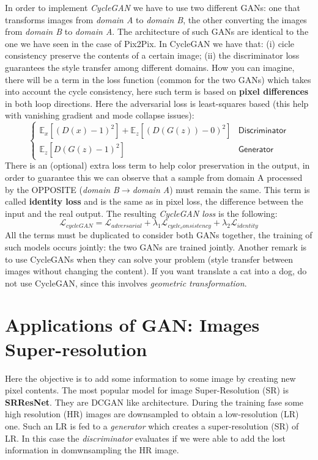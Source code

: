 In order to implement \textit{CycleGAN} we have to use two different GANs: one that transforms images from \textit{domain A} to \textit{domain B}, the other converting the images from \textit{domain B} to \textit{domain A}. The architecture of such GANs are identical to the one we have seen in the case of Pix2Pix. In CycleGAN we have that: (i) cicle consistency preserve the contents of a certain image; (ii) the discriminator loss guarantees the style transfer among different domains. How you can imagine, there will be a term in the loss function (common for the two GANs) which takes into account the cycle consistency, here such term is based on \textbf{pixel differences} in both loop directions. Here the adversarial loss is least-squares based (this help with vanishing gradient and mode collapse issues): 
\begin{equation*}
    \begin{cases}
        \mathbb{E}_x[(D(x)-1)^2]+\mathbb{E}_z[(D(G(z))-0)^2]&\textsf{Discriminator}\\
        \mathbb{E}_z[D(G(z)-1)^2]&\textsf{Generator}
    \end{cases}
\end{equation*}
\noindent
There is an (optional) extra loss term to help color preservation in the output, in order to guarantee this we can observe that a sample from domain A processed by the OPPOSITE (\textit{domain B}$\to$\textit{domain A}) must remain the same. This term is called \textbf{identity loss} and is the same as in pixel loss, the difference between the input and the real output. The resulting \textit{CycleGAN loss} is the following:
\begin{equation}
    \mathcal{L}_{cycleGAN}=\mathcal{L}_{adversarial}+\lambda_1{\mathcal{L}_{cycle_consistency}}+\lambda_2{\mathcal{L}_{identity}}
\end{equation}
All the terms must be duplicated to consider both GANs together, the training of such models occurs jointly: the two GANs are trained jointly. Another remark is to use CycleGANs when they can solve your problem (style transfer between images without changing the content). If you want translate a cat into a dog, do not use CycleGAN, since this involves \textit{geometric transformation}.

\section{Applications of GAN: Images Super-resolution}
Here the objective is to add some information to some image by creating new pixel contents. The most popular model for image Super-Resolution (SR) is \textbf{SRResNet}. They are DCGAN like architecture. During the training fase some high resolution (HR) images are downsampled to obtain a low-resolution (LR) one. Such an LR is fed to a \textit{generator} which creates a super-resolution (SR) of LR. In this case the \textit{discriminator} evaluates if we were able to add the lost information in domwnsampling the HR image.

